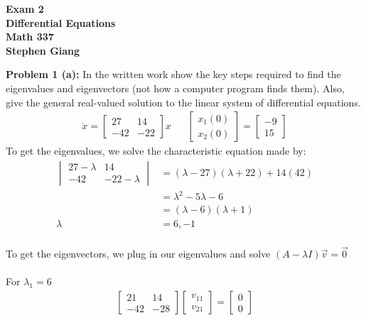 \documentclass[12pt]{article}
\begin{document}
	
	\begin{center}
		\textbf{Exam 2} \\
		\textbf{Differential Equations} \\
		\textbf{Math 337} \\
		\textbf{Stephen Giang} \\
	\end{center}

\noindent \textbf{Problem 1 (a): }In the written work show the key steps required to find the eigenvalues and eigenvectors (not how a computer program finds them). Also, give the general real-valued solution to the linear system of differential equations.
	\begin{align*}
		\dot{x} = 
		\begin{bmatrix}
		27 & 14 \\ -42 & -22
		\end{bmatrix}
		x 
		&& 
		\begin{bmatrix}
			x_1(0) \\ x_2(0)
		\end{bmatrix}
		= 
		\begin{bmatrix}
			-9 \\ 15
		\end{bmatrix}
	\end{align*}
To get the eigenvalues, we solve the characteristic equation made by:
	\begin{align*}
		\begin{vmatrix}
			27 - \lambda & 14 \\
			-42 & -22 - \lambda 
		\end{vmatrix}
		&= (\lambda -27)(\lambda + 22) + 14(42) \\
		&= \lambda^2 - 5\lambda - 6 \\
		&= (\lambda - 6)(\lambda + 1) \\
		\lambda &= 6,-1
	\end{align*}
\\
To get the eigenvectors, we plug in our eigenvalues and solve $(A - \lambda I)\vec{v} = \vec{0}$
\\ \\
For $\lambda_1 = 6$
	\begin{align*}
		\begin{bmatrix}
			21 & 14 \\ -42 & -28
		\end{bmatrix}
		\begin{bmatrix}
			v_{11} \\ v_{21}
		\end{bmatrix}
		= 
		\begin{bmatrix}
			0 \\ 0
		\end{bmatrix}
	\end{align*} 
\end{document}
